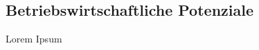\subsection{Betriebswirtschaftliche Potenziale}
\label{Betriebswirtschaftliche Potenziale}
Lorem Ipsum